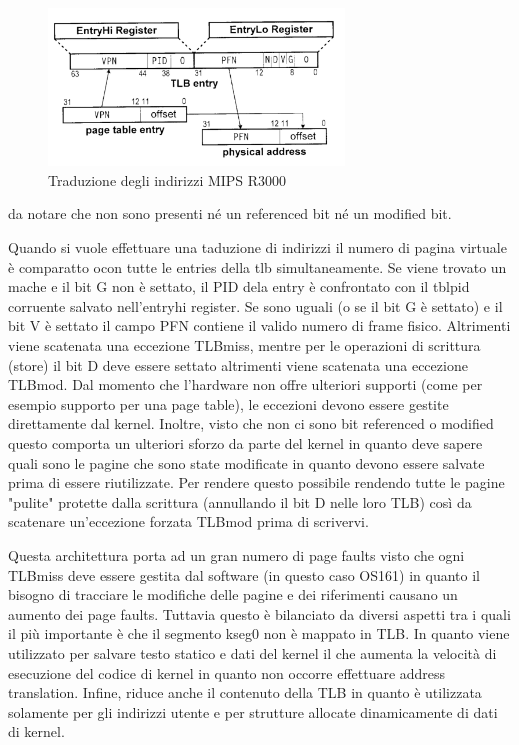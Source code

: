 \begin{figure}[hbt!]
    \centering
    \includegraphics[width=0.7\textwidth]{Memoria Virtuale/images/MIPS R3000 address translation.png}
    \caption{Traduzione degli indirizzi MIPS R3000}
    \label{mips_r3000}
\end{figure}
da notare che non sono presenti né un referenced bit né un modified bit.

Quando si vuole effettuare una taduzione di indirizzi il numero di pagina virtuale è comparatto ocon tutte le entries della tlb simultaneamente. Se viene trovato un mache e il bit G non è settato, il PID dela entry è confrontato con il tblpid corruente salvato nell'entryhi register. Se sono uguali (o se il bit G è settato) e il bit V è settato il campo PFN contiene il valido numero di frame fisico. Altrimenti viene scatenata una eccezione TLBmiss, mentre per le operazioni di scrittura (store) il bit D deve essere settato altrimenti viene scatenata una eccezione TLBmod.
Dal momento che l'hardware non offre ulteriori supporti (come per esempio supporto per una page table), le eccezioni devono essere gestite direttamente dal kernel. Inoltre, visto che non ci sono bit referenced o modified questo comporta un ulteriori sforzo da parte del kernel in quanto deve sapere quali sono le pagine che sono state modificate in quanto devono essere salvate prima di essere riutilizzate. Per rendere questo possibile rendendo tutte le pagine "pulite" protette dalla scrittura (annullando il bit D nelle loro TLB) così da scatenare un'eccezione forzata TLBmod prima di scrivervi.

Questa architettura porta ad un gran numero di page faults visto che ogni TLBmiss deve essere gestita dal software (in questo caso OS161) in quanto il bisogno di tracciare le modifiche delle pagine e dei riferimenti causano un aumento dei page faults. Tuttavia questo è bilanciato da diversi aspetti tra i quali il più importante è che il segmento kseg0 non è mappato in TLB. In quanto viene utilizzato per salvare testo statico e dati del kernel il che aumenta la velocità di esecuzione del codice di kernel in quanto non occorre effettuare address translation. Infine, riduce anche il contenuto della TLB in quanto è utilizzata solamente per gli indirizzi utente e per strutture allocate dinamicamente di dati di kernel.
